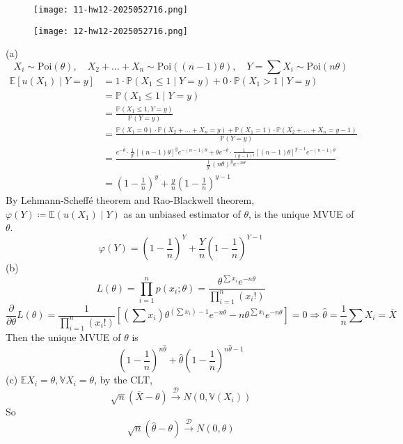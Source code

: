 \begin{exercise}
\begin{figure}[H]
\centering
\texttt{[image: 11-hw12-2025052716.png]}
\label{}
\end{figure}
\begin{figure}[H]
\centering
\texttt{[image: 12-hw12-2025052716.png]}
\label{}
\end{figure}
\end{exercise}
(a)
\[
X_i\sim \text{Poi}(\theta),\quad X_2+\dots+X_n\sim \text{Poi}((n-1)\theta),\quad Y=\sum X_i\sim \text{Poi}(n\theta)
\]
\[
\begin{aligned}
\mathbb{E}[u(X_1)\mid Y=y] & =1\cdot \mathbb{P}(X_1\leq 1 \mid Y=y)+0\cdot \mathbb{P}(X_1>1 \mid Y=y) \\
 & =\mathbb{P}(X_1\leq 1 \mid Y=y) \\
 & =\frac{\mathbb{P}(X_1\leq 1,Y=y)}{\mathbb{P}(Y=y)} \\
 & =\frac{\mathbb{P}(X_1=0)\cdot \mathbb{P}(X_2+\dots+X_n=y)+\mathbb{P}(X_1=1)\cdot \mathbb{P}(X_2+\dots+X_n=y-1)}{\mathbb{P}(Y=y)} \\
 & =\frac{e^{ -\theta }\cdot\frac{1}{y!}[(n-1)\theta]^{y}e^{ -(n-1)\theta }+\theta e^{ -\theta }\cdot\frac{1}{(y-1)!}[(n-1)\theta]^{y-1}e^{ -(n-1)\theta }}{\frac{1}{y!}(n\theta)^{y}e^{ -n\theta }} \\
 & =\left( 1-\frac{1}{n} \right)^{y}+\frac{y}{n}\left( 1-\frac{1}{n} \right)^{y-1}
\end{aligned}
\]
By Lehmann-Scheffé theorem and Rao-Blackwell theorem, $\varphi(Y)\coloneqq \mathbb{E}(u(X_1)\mid Y)$ as an unbiased estimator of $\theta$, is the unique MVUE of $\theta$.
\[
\varphi(Y)=\left( 1-\frac{1}{n} \right)^{Y}+\frac{Y}{n}\left( 1-\frac{1}{n} \right)^{Y-1}
\]
(b)
\[
L(\theta)=\prod_{i=1}^{n} p(x_i;\theta)=\frac{\theta^{\sum x_i}e^{ -n\theta }}{\prod_{i=1}^{n} (x_i!)}
\]
\[
\frac{ \partial   }{ \partial \theta } L(\theta)=\frac{1}{\prod_{i=1}^{n} (x_i!)}\left[ \left( \sum x_i \right)\theta^{\left( \sum x_i \right)-1}e^{ -n\theta }-n\theta^{\sum x_i}e^{ -n\theta } \right]=0\Rightarrow\widehat{\theta}=\frac{1}{n}\sum X_i=\overline{X}
\]
Then the unique MVUE of $\theta$ is
\[
\left( 1-\frac{1}{n} \right)^{n\widehat{\theta}}+\widehat{\theta}\left( 1-\frac{1}{n} \right)^{n\widehat{\theta}-1}
\]
(c)
$\mathbb{E}X_i=\theta,\mathbb{V}X_i=\theta$, by the CLT,
\[
\sqrt{ n }(\overline{X}-\theta)\overset{ \mathcal{D} }{ \to }N(0,\mathbb{V}(X_i))
\]
So
\[
\sqrt{ n }(\widehat{\theta}-\theta)\overset{ \mathcal{D} }{ \to }N(0,\theta)
\]
